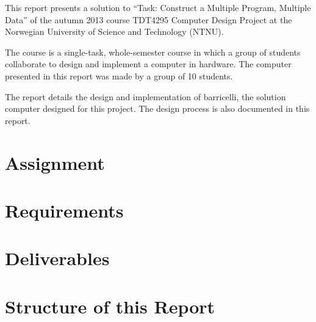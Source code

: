 This report presents a solution to ``Task: Construct a Multiple Program, Multiple Data'' of the autumn 2013 course TDT4295 Computer Design Project at the Norwegian University of Science and Technology (NTNU).

The course is a single-task, whole-semester course in which a group of students collaborate to design and implement a computer in hardware.
The computer presented in this report was made by a group of 10 students.

The report details the design and implementation of \Gls{barricelli}, the solution computer designed for this project.
The design process is also documented in this report.

\section{Assignment}



\section{Requirements}



\section{Deliverables}



\section{Structure of this Report}




